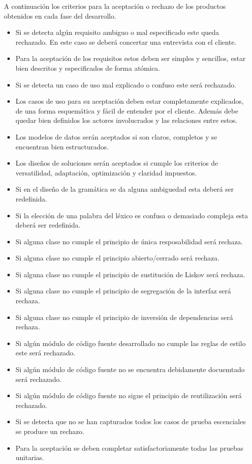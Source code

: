 A continuación los criterios para la aceptación o rechazo de los productos obtenidos en cada fase del desarrollo.

\begin{itemize}
\item Si se detecta algún requisito ambiguo o mal especificado este queda rechazado. En este caso se deberá concertar una entrevista con el cliente.
\item Para la aceptación de los requisitos estos deben ser simples y sencillos, estar bien descritos y especificados de forma atómica.
\item Si se detecta un caso de uso mal explicado o confuso este será rechazado. 
\item Los casos de uso para su aceptación deben estar completamente explicados, de una forma esquemática y fácil de entender por el cliente. Además debe quedar bien definidos 
los actores involucrados y las relaciones entre estos. 
\item Los modelos de datos serán aceptados si son claros, completos y se encuentran bien estructurados.
\item Los diseños de soluciones serán aceptados si cumple los criterios de versatilidad, adaptación, optimización y claridad impuestos.
\item Si en el diseño de la gramática se da alguna ambiguedad esta deberá ser redefinida.
\item Si la elección de una palabra del léxico es confusa o demasiado compleja esta deberá ser redefinida.
\item Si alguna clase no cumple el principio de única resposabilidad será rechaza.
\item Si alguna clase no cumple el principio abierto/cerrado será rechaza.
\item Si alguna clase no cumple el principio de sustitución de Liskov será rechaza.
\item Si alguna clase no cumple el principio de segregación de la interfaz será rechaza.
\item Si alguna clase no cumple el principio de inversión de dependencias será rechaza.
\item Si algún módulo de código fuente desarrollado no cumple las reglas de estilo este será rechazado.
\item Si algún módulo de código fuente no se encuentra debidamente docuemtado será rechazado.
\item Si algún módulo de código fuente no sigue el principio de reutilización será rechazado.
\item Si se detecta que no se han capturados todos los casos de prueba escenciales se produce un rechazo.
\item Para la aceptación se deben completar satisfactoriamente todas las pruebas unitarias.
\end{itemize}


